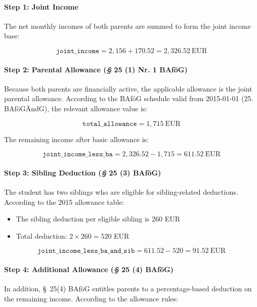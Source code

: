 \paragraph{Step 1: Joint Income}

The net monthly incomes of both parents are summed to form the joint income base:

\[
\texttt{joint\_income} = 2{,}156 + 170.52 = 2{,}326.52~\text{EUR}
\]

\paragraph{Step 2: Parental Allowance (\textit{§} 25 (1) Nr. 1 BAföG)}

Because both parents are financially active, the applicable allowance is the joint parental allowance. According to the BAföG schedule valid from 2015-01-01 (25. BAföGÄndG), the relevant allowance value is:

\[
\texttt{total\_allowance} = 1{,}715~\text{EUR}
\]

The remaining income after basic allowance is:

\[
\texttt{joint\_income\_less\_ba} = 2{,}326.52 - 1{,}715 = 611.52~\text{EUR}
\]

\paragraph{Step 3: Sibling Deduction (\textit{§} 25 (3) BAföG)}

The student has two siblings who are eligible for sibling-related deductions. According to the 2015 allowance table:

\begin{itemize}
    \item The sibling deduction per eligible sibling is 260 EUR
    \item Total deduction: $2 \times 260 = 520$ EUR
\end{itemize}



\[
\texttt{joint\_income\_less\_ba\_and\_sib} = 611.52 - 520 = 91.52~\text{EUR}
\]

\paragraph{Step 4: Additional Allowance (\textit{§} 25 (4) BAföG)}

In addition, §~25(4) BAföG entitles parents to a percentage-based deduction on the remaining income. According to the allowance rules:

